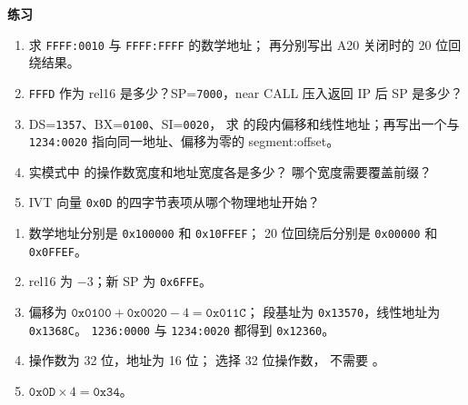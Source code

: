\textbf{练习}
\begin{enumerate}[leftmargin=2.2em]
  \item 求 \texttt{FFFF:0010} 与 \texttt{FFFF:FFFF} 的数学地址；
    再分别写出 A20 关闭时的 20 位回绕结果。
  \item \texttt{FFFD} 作为 rel16 是多少？SP=\texttt{7000}，near CALL
    压入返回 IP 后 SP 是多少？
  \item DS=\texttt{1357}、BX=\texttt{0100}、SI=\texttt{0020}，
    求 \code{[bx+si-4]} 的段内偏移和线性地址；再写出一个与
    \texttt{1234:0020} 指向同一地址、偏移为零的 segment:offset。
  \item 实模式中  的操作数宽度和地址宽度各是多少？
    哪个宽度需要覆盖前缀？
  \item IVT 向量 \texttt{0x0D} 的四字节表项从哪个物理地址开始？
\end{enumerate}
\begin{answerbox}
\begin{enumerate}[leftmargin=2.2em]
  \item 数学地址分别是 \texttt{0x100000} 和 \texttt{0x10FFEF}；
    20 位回绕后分别是 \texttt{0x00000} 和 \texttt{0x0FFEF}。
  \item rel16 为 \(-3\)；新 SP 为 \texttt{0x6FFE}。
  \item 偏移为
    \(\texttt{0x0100}+\texttt{0x0020}-4=\texttt{0x011C}\)；
    段基址为 \texttt{0x13570}，线性地址为 \texttt{0x1368C}。
    \texttt{1236:0000} 与 \texttt{1234:0020} 都得到
    \texttt{0x12360}。
  \item 操作数为 32 位，地址为 16 位； 选择 32 位操作数，
    不需要 。
  \item \(\texttt{0x0D}\times4=\texttt{0x34}\)。
\end{enumerate}
\end{answerbox}
